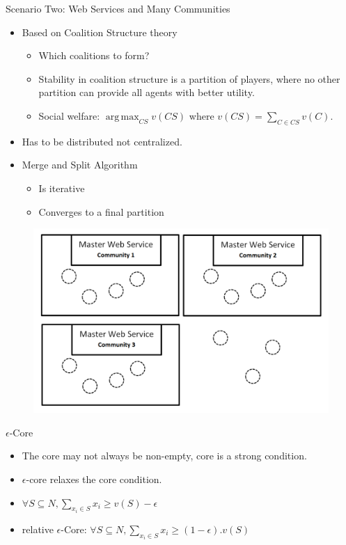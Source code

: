 \documentclass{beamer}
\begin{document}
\begin{frame}{Scenario Two: Web Services and Many Communities}
    \begin{itemize}
        \item Based on Coalition Structure theory
        \begin{itemize}
            \item Which coalitions to form?
            \item Stability in coalition structure is a partition of players, where no other partition can provide all agents with better utility.
            \item Social welfare: $\operatorname*{arg\,max}_{CS} v(CS)$ where $v(CS) = \sum_{C \in CS}v(C)$.
        \end{itemize}
        \item Has to be distributed not centralized.
        \item Merge and Split Algorithm {\footnotesize{\color{blue}{(Krzysztof R. Apt and Andreas Witzel)}}}
        \begin{itemize}
            \item Is iterative
            \item Converges to a final partition
        \end{itemize}
    \end{itemize}
    \begin{figure}[htbp]
        \centering
        \includegraphics[width=0.5 \columnwidth]{figures/scenario2.png}
    \end{figure}       	
\end{frame}

\begin{frame}{$\epsilon$-Core}
    \begin{itemize}
        \item The core may not always be non-empty, core is a strong condition.
        \item $\epsilon$-core relaxes the core condition.
        \item $\forall S \subseteq N, \sum_{x_i \in S} x_i \geq v(S) - \epsilon$
        \item relative $\epsilon$-Core: $\forall S \subseteq N, \sum_{x_i \in S} x_i \geq (1-\epsilon).v(S)$
    \end{itemize}
\end{frame}
\end{document}
